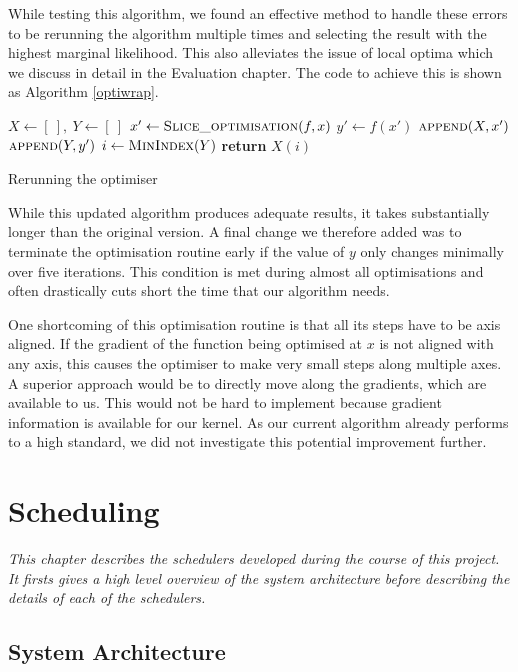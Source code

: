 \documentclass[a4paper,12pt,twoside,openright]{report}
\begin{document}
While testing this algorithm, we found an effective method to handle these errors to be rerunning the algorithm multiple times and selecting the result with the highest marginal likelihood. This also alleviates the issue of local optima which we discuss in detail in the Evaluation chapter. The code to achieve this is shown as Algorithm \ref{optiwrap}.

\begin{algorithm}
\begin{algorithmic}[1]
\State $X \gets [\ ],\ Y \gets [\ ]$
\State $x'\gets \Call{Slice\_optimisation}{f, x}$
\State $y'\gets f(x')$
\State $\Call{append}{X, x'}$
\State $\Call{append}{Y, y'}$
\EndFor
\State $i\gets \Call{MinIndex}{Y}$
\State \textbf{return} $X(i)$
\EndProcedure
\end{algorithmic}
\caption{Rerunning the optimiser}
\label{optiwrap}
\end{algorithm}

While this updated algorithm produces adequate results, it takes substantially longer than the original version. A final change we therefore added was to terminate the optimisation routine early if the value of $y$ only changes minimally over five iterations. This condition is met during almost all optimisations and often drastically cuts short the time that our algorithm needs.

One shortcoming of this optimisation routine is that all its steps have to be axis aligned. If the gradient of the function being optimised at $x$ is not aligned with any axis, this causes the optimiser to make very small steps along multiple axes. A superior approach would be to directly move along the gradients, which are available to us. This would not be hard to implement because gradient information is available for our kernel. As our current algorithm already performs to a high standard, we did not investigate this potential improvement further.


\chapter{Scheduling} 
\textit{This chapter describes the schedulers developed during the course of this project. It firsts gives a high level overview of the system architecture before describing the details of each of the schedulers.}

\section{System Architecture}
\end{document}
